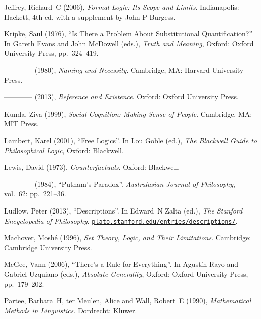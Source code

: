 \documentclass[openany,leqno,11pt]{book}
\theoremstyle{break}
\theoremstyle{definition}
\theoremstyle{remark}
\begin{document}
{\begin{thebibliography}{39}
Jeffrey, Richard~C (2006), \emph{Formal Logic: Its Scope and Limits}. Indianapolis: Hackett, 4th ed, with a supplement by John P Burgess.

Kripke, Saul (1976), \enquote{Is There a Problem About Substitutional
  Quantification?} In Gareth Evans and John McDowell (eds.), \emph{Truth and
  Meaning}, Oxford: Oxford University Press, pp.~324–419.

---\!\!---\!\!---\!\!--- (1980), \emph{Naming and Necessity}. Cambridge, MA:
  Harvard University Press.

---\!\!---\!\!---\!\!--- (2013), \emph{Reference and Existence}. Oxford:
  Oxford University Press.

Kunda, Ziva (1999), \emph{Social Cognition: Making Sense of People}.
  Cambridge, MA: MIT Press.

Lambert, Karel (2001), \enquote{Free Logics}. In Lou Goble (ed.), \emph{The
  Blackwell Guide to Philosophical Logic}, Oxford: Blackwell.

Lewis, David (1973), \emph{Counterfactuals}. Oxford: Blackwell.

---\!\!---\!\!---\!\!--- (1984), \enquote{Putnam's Paradox}. \emph{Australasian
  Journal of Philosophy}, vol.~62: pp.~221–36.

Ludlow, Peter (2013), \enquote{Descriptions}. In Edward~N Zalta (ed.), \emph{The Stanford Encyclopedia of Philosophy}. \urlprefix\href{http://plato.stanford.edu/entries/descriptions/}{\nolinkurl{plato.stanford.edu/entries/descriptions/}}.

Machover, Moshé (1996), \emph{Set Theory, Logic, and Their Limitations}.
  Cambridge: Cambridge University Press.

McGee, Vann (2006), \enquote{There's a Rule for Everything}. In Agust\'{i}n
  Rayo and Gabriel Uzquiano (eds.), \emph{Absolute Generality}, Oxford: Oxford
  University Press, pp.~179–202.

Partee, Barbara~H, {ter Meulen}, Alice and Wall, Robert~E (1990), \emph{Mathematical Methods in Linguistics}. Dordrecht: Kluwer.


\end{thebibliography}}
\end{document}
